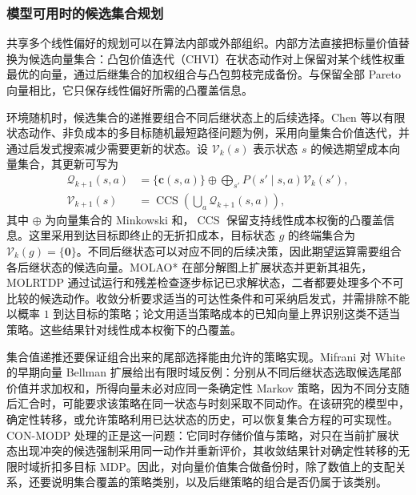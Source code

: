 \subsubsection{模型可用时的候选集合规划}

共享多个线性偏好的规划可以在算法内部或外部组织。内部方法直接把标量价值替换为候选向量集合：凸包价值迭代（CHVI）在状态动作对上保留对某个线性权重最优的向量，通过后继集合的加权组合与凸包剪枝完成备份\cite{barrett2008}。与保留全部 Pareto 向量相比，它只保存线性偏好所需的凸覆盖信息。

环境随机时，候选集合的递推要组合不同后继状态上的后续选择。Chen 等以有限状态动作、非负成本的多目标随机最短路径问题为例，采用向量集合价值迭代，并通过启发式搜索减少需要更新的状态\cite{chen2023mossp}。设 $\mathcal V_k(s)$ 表示状态 $s$ 的候选期望成本向量集合，其更新可写为
\begin{equation}
\begin{aligned}
\mathcal Q_{k+1}(s,a)
&=\{\mathbf c(s,a)\}\oplus
\bigoplus_{s'}P(s'\mid s,a)\mathcal V_k(s'),\\
\mathcal V_{k+1}(s)
&=\operatorname{CCS}\!\left(\bigcup_a\mathcal Q_{k+1}(s,a)\right),
\end{aligned}
\end{equation}
其中 $\oplus$ 为向量集合的 Minkowski 和，$\operatorname{CCS}$ 保留支持线性成本权衡的凸覆盖信息。这里采用到达目标即终止的无折扣成本，目标状态 $g$ 的终端集合为 $\mathcal V_k(g)=\{\mathbf 0\}$。不同后继状态可以对应不同的后续决策，因此期望运算需要组合各后继状态的候选向量。MOLAO* 在部分解图上扩展状态并更新其祖先，MOLRTDP 通过试运行和残差检查逐步标记已求解状态，二者都要处理多个不可比较的候选动作。收敛分析要求适当的可达性条件和可采纳启发式，并需排除不能以概率 $1$ 到达目标的策略；论文用适当策略成本的已知向量上界识别这类不适当策略。这些结果针对线性成本权衡下的凸覆盖。

集合值递推还要保证组合出来的尾部选择能由允许的策略实现。Mifrani 对 White 的早期向量 Bellman 扩展给出有限时域反例：分别从不同后继状态选取候选尾部价值并求加权和，所得向量未必对应同一条确定性 Markov 策略，因为不同分支随后汇合时，可能要求该策略在同一状态与时刻采取不同动作\cite{mifrani2025bellman}。在该研究的模型中，确定性转移，或允许策略利用已达状态的历史，可以恢复集合方程的可实现性。CON-MODP 处理的正是这一问题：它同时存储价值与策略，对只在当前扩展状态出现冲突的候选强制采用同一动作并重新评价，其收敛结果针对确定性转移的无限时域折扣多目标 MDP\cite{wiering2007conmodp}。因此，对向量价值集合做备份时，除了数值上的支配关系，还要说明集合覆盖的策略类别，以及后继策略的组合是否仍属于该类别。

